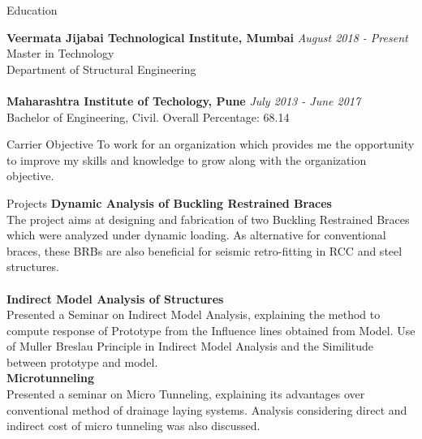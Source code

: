 \documentclass{resume} %
\begin{document}

\begin{rSection}{Education}

{\bf Veermata Jijabai Technological Institute, Mumbai} \hfill {\em August 2018 - Present} 
\\ Master in Technology
\\ Department of Structural Engineering\\
\\{\bf Maharashtra Institute of Techology, Pune} \hfill {\em July 2013 - June 2017} 
\\ Bachelor of Engineering, Civil.\hfill { Overall Percentage: 68.14 }


\end{rSection}

\begin{rSection}{Carrier Objective}
 To work for an organization which provides me the opportunity to improve my skills and knowledge to grow along with the organization objective.
\end{rSection}
\begin{rSection}{Projects}
{\bf Dynamic Analysis of Buckling Restrained Braces}
\\The project aims at designing and fabrication of two Buckling Restrained Braces which were analyzed under dynamic loading. As alternative for conventional braces, these BRBs are also beneficial for seismic retro-fitting in RCC and steel structures.\\
\\{\bf Indirect Model Analysis of Structures}\\
Presented a Seminar on Indirect Model Analysis, explaining the method to compute response of Prototype from the Influence lines obtained from Model. Use of Muller Breslau Principle in Indirect Model Analysis and the Similitude between prototype and  model.\\

{\bf Microtunneling}\\
Presented a seminar on Micro Tunneling, explaining its advantages over conventional method of drainage laying systems. Analysis considering direct and indirect cost of micro tunneling was also discussed.

\end{rSection}
\end{document}
